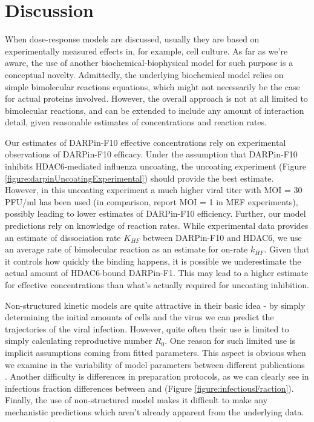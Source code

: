 \section{Discussion}

When dose-response models are discussed, usually they are based on experimentally measured effects in, for example, cell culture. As far as we're aware, the use of another biochemical-biophysical model for such purpose is a conceptual novelty. Admittedly, the underlying biochemical model relies on simple bimolecular reactions equations, which might not necessarily be the case for actual proteins involved. However, the overall approach is not at all limited to bimolecular reactions, and can be extended to include any amount of interaction detail, given reasonable estimates of concentrations and reaction rates.

Our estimates of DARPin-F10 effective concentrations rely on experimental observations of DARPin-F10 efficacy. Under the assumption that DARPin-F10 inhibits HDAC6-mediated influenza uncoating, the uncoating experiment (Figure \ref{figure:darpinUncoatingExperimental}) should provide the best estimate. However, in this uncoating experiment a much higher viral titer with MOI = 30 PFU/ml has been used (in comparison, \cite{banerjee2014influenza} report MOI = 1 in MEF experiments), possibly leading to lower estimates of DARPin-F10 efficiency. Further, our model predictions rely on knowledge of reaction rates. While experimental data provides an estimate of dissociation rate $K_{HF}$ between DARPin-F10 and HDAC6, we use an average rate of bimolecular reaction \cite{bionumbersbimolrate} as an estimate for on-rate $k_{HF}$. Given that it controls how quickly the binding happens, it is possible we underestimate the actual amount of HDAC6-bound DARPin-F1. This may lead to a higher estimate for effective concentrations than what's actually required for uncoating inhibition.

Non-structured kinetic models are quite attractive in their basic idea - by simply determining the initial amounts of cells and the virus we can predict the trajectories of the viral infection. However, quite often their use is limited to simply calculating reproductive number $R_0$. One reason for such limited use is implicit assumptions coming from fitted parameters. This aspect is obvious when we examine in the variability of model parameters between different publications \cite{smith2011influenza}. Another difficulty is differences in preparation protocols, as we can clearly see in infectious fraction differences between \cite{rudiger2019multiscale} and \cite{schulze2009infection} (Figure \ref{figure:infectiousFraction}). Finally, the use of non-structured model makes it difficult to make any mechanistic predictions which aren't already apparent from the underlying data.

